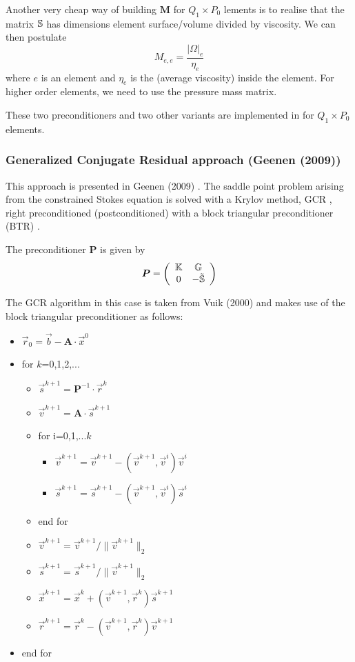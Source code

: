 Another very cheap way of building ${\bm M}$ for $Q_1\times P_0$ lements 
is to realise that the matrix ${\mathbb{S}}$ has dimensions element surface/volume 
divided by viscosity. We can then postulate 
\[
M_{e,e} = \frac{|\Omega|_e}{\eta_e} 
\]
where $e$ is an element and $\eta_e$ is the (average viscosity) inside the element.
For higher order elements, we need to use the pressure mass matrix.

These two preconditioners and two other variants are implemented in  for 
$Q_1\times P_0$ elements.

\subsubsection{Generalized Conjugate Residual approach (Geenen \etal (2009))}

This approach is presented in Geenen \etal (2009) \cite{geum09}. 
The saddle point problem arising from the constrained Stokes equation is 
solved with a Krylov method, GCR \cite{vavu94}, right preconditioned (postconditioned) 
with a block triangular preconditioner (BTR) \cite{brpa88}.

The preconditioner ${\bm P}$ is given by
\[
{\bm P} = \left(
\begin{array}{cc}
{\mathbb{K}} & {\mathbb{G}} \\
0 & - \tilde{{\mathbb{S}}}
\end{array}
\right)
\]

The GCR algorithm \cite{eies83} in this case is taken from Vuik \etal (2000) \cite{vusb00}
and makes use of the block triangular preconditioner as follows:
\begin{itemize}
\item[] $\vec{r}_0 = \vec{b} - {\bm A}\cdot \vec{x}^0$
\item[] for $k$=0,1,2,...
\begin{itemize}
\item $\vec{s}^{k+1}={\bm P}^{-1} \cdot \vec{r}^k$
\item $\vec{v}^{k+1} = {\bm A}\cdot \vec{s}^{k+1}$
\item for i=0,1,...$k$
\begin{itemize}
\item $\vec{v}^{k+1}=\vec{v}^{k+1} - (\vec{v}^{k+1},\vec{v}^{i}) \vec{v}^i$
\item $\vec{s}^{k+1}=\vec{s}^{k+1} - (\vec{v}^{k+1},\vec{v}^{i}) \vec{s}^i$
\end{itemize}
\item end for
\item $\vec{v}^{k+1}=\vec{v}^{k+1} / \| \vec{v}^{k+1} \|_2$
\item $\vec{s}^{k+1}=\vec{s}^{k+1} / \| \vec{v}^{k+1} \|_2$  
\item $\vec{x}^{k+1} = \vec{x}^k + (\vec{v}^{k+1},\vec{r}^k) \vec{s}^{k+1} $
\item $\vec{r}^{k+1} = \vec{r}^k - (\vec{v}^{k+1}, \vec{r}^k) \vec{v}^{k+1}$
\end{itemize}
\item[] end for
\end{itemize}

